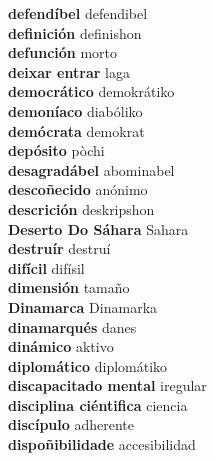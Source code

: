 \textbf{ defendíbel  } defendibel \\
\textbf{ definición  } definishon \\
\textbf{ defunción  } morto \\
\textbf{ deixar entrar  } laga \\
\textbf{ democrático  } demokrátiko \\
\textbf{ demoníaco  } diabóliko \\
\textbf{ demócrata  } demokrat \\
\textbf{ depósito  } pòchi \\
\textbf{ desagradábel  } abominabel \\
\textbf{ descoñecido  } anónimo \\
\textbf{ descrición  } deskripshon \\
\textbf{ Deserto Do Sáhara  } Sahara \\
\textbf{ destruír  } destruí \\
\textbf{ difícil  } difísil \\
\textbf{ dimensión  } tamaño \\
\textbf{ Dinamarca  } Dinamarka \\
\textbf{ dinamarqués  } danes \\
\textbf{ dinámico  } aktivo \\
\textbf{ diplomático  } diplomátiko \\
\textbf{ discapacitado mental  } iregular \\
\textbf{ disciplina ciéntifica  } ciencia \\
\textbf{ discípulo  } adherente \\
\textbf{ dispoñibilidade  } accesibilidad \\
